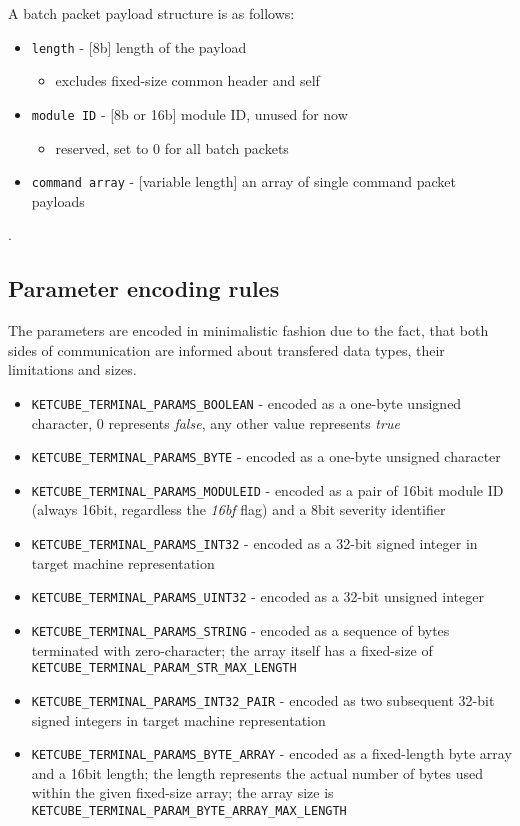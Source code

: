 A batch packet payload structure is as follows:

\begin{itemize}
	\item \texttt{length} - [8b] length of the payload
		\begin{itemize}
			\item excludes fixed-size common header and self
		\end{itemize}
	\item \texttt{module ID} - [8b or 16b] module ID, unused for now
		\begin{itemize}
			\item reserved, set to 0 for all batch packets
		\end{itemize}
	\item \texttt{command array} - [variable length] an array of single command packet payloads
\end{itemize}

.

\subsection{Parameter encoding rules}

The parameters are encoded in minimalistic fashion due to the fact, that both sides of communication are informed about transfered data types, their limitations and sizes.

\begin{itemize}
	\item \texttt{KETCUBE\_TERMINAL\_PARAMS\_BOOLEAN} - encoded as a one-byte unsigned character, 0 represents \textit{false}, any other value represents \textit{true}
	\item \texttt{KETCUBE\_TERMINAL\_PARAMS\_BYTE} - encoded as a one-byte unsigned character
	\item \texttt{KETCUBE\_TERMINAL\_PARAMS\_MODULEID} - encoded as a pair of 16bit module ID (always 16bit, regardless the \textit{16bf} flag) and a 8bit severity identifier
	\item \texttt{KETCUBE\_TERMINAL\_PARAMS\_INT32} - encoded as a 32-bit signed integer in target machine representation
	\item \texttt{KETCUBE\_TERMINAL\_PARAMS\_UINT32} - encoded as a 32-bit unsigned integer
	\item \texttt{KETCUBE\_TERMINAL\_PARAMS\_STRING} - encoded as a sequence of bytes terminated with zero-character; the array itself has a fixed-size of \texttt{KETCUBE\_TERMINAL\_PARAM\_STR\_MAX\_LENGTH}
	\item \texttt{KETCUBE\_TERMINAL\_PARAMS\_INT32\_PAIR} - encoded as two subsequent 32-bit signed integers in target machine representation
	\item \texttt{KETCUBE\_TERMINAL\_PARAMS\_BYTE\_ARRAY} - encoded as a fixed-length byte array and a 16bit length; the length represents the actual number of bytes used within the given fixed-size array; the array size is \texttt{KETCUBE\_TERMINAL\_PARAM\_BYTE\_ARRAY\_MAX\_LENGTH}
\end{itemize}

